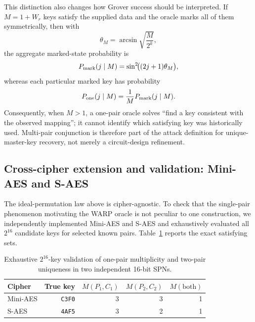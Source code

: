 \documentclass[pdflatex,sn-nature]{sn-jnl}
\theoremstyle{thmstyleone}
\theoremstyle{thmstyletwo}
\begin{document}
This distinction also changes how Grover success should be interpreted.  If $M=1+W_r$ keys satisfy the supplied data and the oracle marks all of them symmetrically, then with
\begin{equation}
    \theta_M=\arcsin\sqrt{\frac{M}{2^k}},
\end{equation}
the aggregate marked-state probability is
\begin{equation}
    P_{\rm mark}(j\mid M)=
    \sin^2\!\bigl((2j+1)\theta_M\bigr),
    \label{eq:aggregate_marked_probability}
\end{equation}
whereas each particular marked key has probability
\begin{equation}
    P_{\rm one}(j\mid M)=\frac{1}{M}P_{\rm mark}(j\mid M).
    \label{eq:specific_marked_probability}
\end{equation}
Consequently, when $M>1$, a one-pair oracle solves ``find a key consistent with the observed mapping''; it cannot identify which satisfying key was historically used.  Multi-pair conjunction is therefore part of the attack definition for unique-master-key recovery, not merely a circuit-design refinement.

\subsection{Cross-cipher extension and validation: Mini-AES and S-AES}
\label{subsec:cross_cipher_validation}
The ideal-permutation law above is cipher-agnostic.  To check that the single-pair phenomenon motivating the WARP oracle is not peculiar to one construction, we independently implemented Mini-AES and S-AES and exhaustively evaluated all $2^{16}$ candidate keys for selected known pairs.  Table~\ref{tab:cross_cipher_validation} reports the exact satisfying sets.

\begin{table}[htbp]
\centering
\caption{Exhaustive $2^{16}$-key validation of one-pair multiplicity and two-pair uniqueness in two independent 16-bit SPNs.}
\label{tab:cross_cipher_validation}
\begin{tabular}{lrrrr}
\toprule
Cipher & True key & $M(P_1,C_1)$ & $M(P_2,C_2)$ & $M(\text{both})$\\
\midrule
Mini-AES & \texttt{C3F0} & 3 & 3 & 1\\
S-AES & \texttt{4AF5} & 3 & 2 & 1\\
\bottomrule
\end{tabular}
\end{table}
\end{document}
